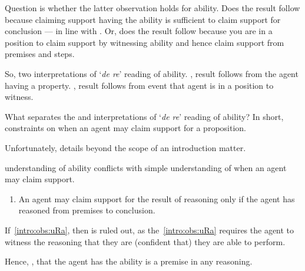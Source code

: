 \begin{note}
  Question is whether the latter observation holds for ability.
  Does the result follow because claiming support having the ability is sufficient to claim support for conclusion --- in line with \AR{}.
  Or, does the result follow because you are in a position to claim support by witnessing ability and hence claim support from premises and steps.

  So, two interpretations of `\emph{de re}' reading of ability.
  \AR{}, result follows from the agent having a property.
  \WR{}, result follows from event that agent is in a position to witness.
\end{note}

\begin{note}
  What separates the \AR{} and \WR{} interpretations of `\emph{de re}' reading of ability?
  In short, constraints on when an agent may claim support for a proposition.

  Unfortunately, details beyond the scope of an introduction matter.
  

  \WR{} understanding of ability conflicts with simple understanding of when an agent may claim support.

  \begin{enumerate}[label=(O\arabic*), ref=(O\arabic*), resume*=i_ob]
  \item\label{intro:obs:uRa} An agent may claim support for the result of reasoning only if the agent has reasoned from premises to conclusion.
  \end{enumerate}
  If~\ref{intro:obs:uRa}, then \WR{} is ruled out, as the~\ref{intro:obs:uRa} requires the agent to witness the reasoning that they are (confident that) they are able to perform.

  Hence, \AR{}, that the agent has the ability is a premise in any reasoning.
\end{note}

